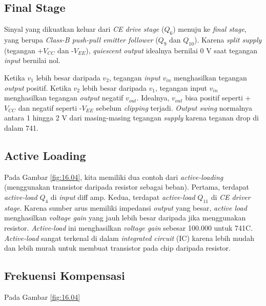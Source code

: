 \subsection{Final Stage}

Sinyal yang dikuatkan keluar dari \textit{CE drive stage} ($ Q_6 $) menuju ke \textit{final stage}, yang berupa \textit{Class-B push-pull emitter follower} ($ Q_9 $ dan $ Q_{10} $). Karena \textit{split supply} (tegangan +$ V_{CC} $ dan -$ V_{EE} $), \textit{quiescent output} idealnya bernilai 0 V saat tegangan \textit{input} bernilai nol.

Ketika $ v_1 $ lebih besar daripada $ v_2 $, tegangan \textit{input} $ v_{in} $ menghasilkan tegangan \textit{output} positif. Ketika $ v_2 $ lebih besar daripada $ v_1 $, tegangan input $ v_{in} $ menghasilkan tegangan \textit{output} negatif $ v_{out} $. Idealnya, $ v_{out} $ bisa positif seperti +$ V_{CC} $ dan negatif seperti -$ V_{EE} $ sebelum \textit{clipping} terjadi. \textit{Output swing} normalnya antara 1 hingga 2 V dari masing-masing tegangan \textit{supply} karena teganan drop di dalam 741.


\subsection{Active Loading}

Pada Gambar \ref{fig:16.04}, kita memiliki dua contoh dari \textit{active-loading} (menggunakan transistor daripada resistor sebagai beban). Pertama, terdapat \textit{active-load} $ Q_4 $ di \textit{input} diff amp. Kedua, terdapat \textit{active-load} $ Q_{11} $ di \textit{CE driver stage}. Karena sumber arus memiliki impedansi \textit{output} yang besar, \textit{active load} menghasilkan \textit{voltage gain} yang jauh lebih besar daripada jika menggunakan resistor. \textit{Active-load} ini menghasilkan \textit{voltage gain} sebesar 100.000 untuk 741C. \textit{Active-load} sangat terkenal di dalam \textit{integrated circuit} (IC) karena lebih mudah dan lebih murah untuk membuat transistor pada chip daripada resistor.


\subsection{Frekuensi Kompensasi}

Pada Gambar \ref{fig:16.04}